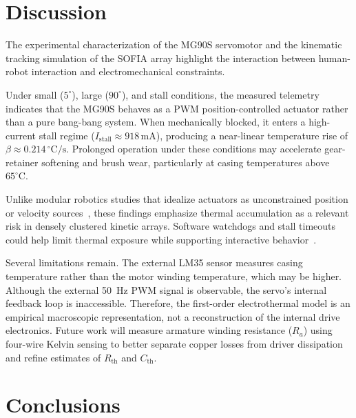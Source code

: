 \documentclass[lettersize,journal]{IEEEtran}
\begin{document}
	
	\section{Discussion}
	\label{sec:discussion}
	
	The experimental characterization of the MG90S
	servomotor and the kinematic tracking simulation of the SOFIA array
	highlight the interaction between human-robot interaction and
	electromechanical constraints.
	
	Under small ($5^\circ$), large ($90^\circ$),
	and stall conditions, the measured telemetry indicates that the
	MG90S behaves as a PWM position-controlled actuator rather than a
	pure bang-bang system. When mechanically blocked, it enters a
	high-current stall regime ($I_{\text{stall}} \approx 918\,\text{mA}$),
	producing a near-linear temperature rise of
	$\beta \approx 0.214\,^\circ\text{C/s}$.
	Prolonged operation under these conditions
	may accelerate gear-retainer softening and brush wear, particularly
	at casing temperatures above $65^\circ\text{C}$.
	
	Unlike modular robotics studies that idealize actuators as
	unconstrained position or velocity sources~\cite{seo2019modular},
	these findings emphasize thermal accumulation as a relevant risk
	in densely clustered kinetic arrays. 	Software watchdogs and stall
	timeouts could help limit thermal exposure while supporting
	interactive behavior~\cite{fong2003social}.
	
	Several limitations remain. The external LM35
	sensor measures casing temperature rather than the motor winding
	temperature, which may be higher. Although the external 50~Hz PWM
	signal is observable, the servo's internal feedback loop is
	inaccessible. Therefore, the first-order electrothermal model is
	an empirical macroscopic representation, not a reconstruction of
	the internal drive electronics. Future work will measure armature
	winding resistance ($R_a$) using four-wire Kelvin sensing to better
	separate copper losses from driver dissipation and refine estimates
	of $R_{\text{th}}$ and $C_{\text{th}}$.
	
	\section{Conclusions}
	\label{sec:conclusions}
	
\end{document}
